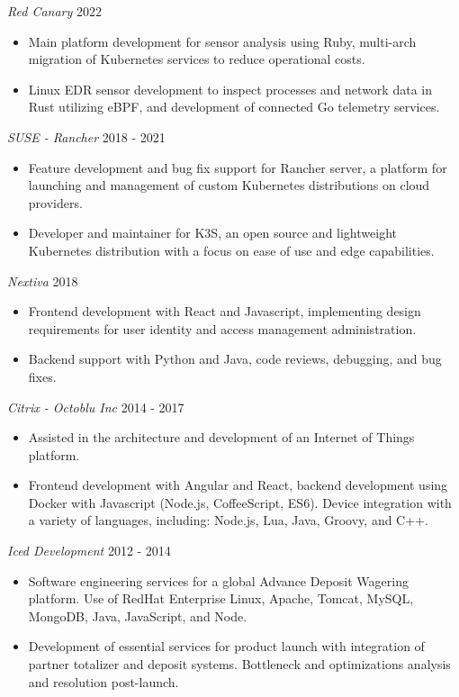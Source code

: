\documentclass[line,margin]{res}
\begin{document}
\begin{resume}
          {\sl Red Canary} \hfill 2022
          \begin{itemize} \itemsep -2pt
          \item
            Main platform development for sensor analysis using Ruby, multi-arch migration of Kubernetes services to reduce operational costs.
          \item
            Linux EDR sensor development to inspect processes and network data in Rust utilizing eBPF, and development of connected Go telemetry services.
          \end{itemize}

          {\sl SUSE - Rancher} \hfill 2018 - 2021
          \begin{itemize} \itemsep -2pt
          \item
            Feature development and bug fix support for Rancher server, a platform for launching and management of custom Kubernetes distributions on cloud providers.
          \item
            Developer and maintainer for K3S, an open source and lightweight Kubernetes distribution with a focus on ease of use and edge capabilities.
          \end{itemize}

          {\sl Nextiva} \hfill 2018
          \begin{itemize} \itemsep -2pt
          \item
            Frontend development with React and Javascript, implementing design requirements for user identity and 
            access management administration.
          \item
            Backend support with Python and Java, code reviews, debugging, and bug fixes.
          \end{itemize}

          {\sl Citrix - Octoblu Inc} \hfill 2014 - 2017
          \begin{itemize} \itemsep -2pt
          \item
            Assisted in the architecture and development of an Internet of Things platform.
          \item
            Frontend development with Angular and React, backend development using Docker with Javascript (Node.js, CoffeeScript, ES6).
            Device integration with a variety of languages, including: Node.js, Lua, Java, Groovy, and C++.
          \end{itemize}

          {\sl Iced Development} \hfill 2012 - 2014
          \begin{itemize} \itemsep -2pt
          \item
            Software engineering services for a global Advance Deposit Wagering platform. Use of RedHat Enterprise Linux, Apache, Tomcat, MySQL, MongoDB, Java, JavaScript, and Node.
          \item
            Development of essential services for product launch with integration of partner totalizer and deposit systems. Bottleneck and optimizations analysis and resolution post-launch.
          \end{itemize}


\end{resume}
\end{document}
